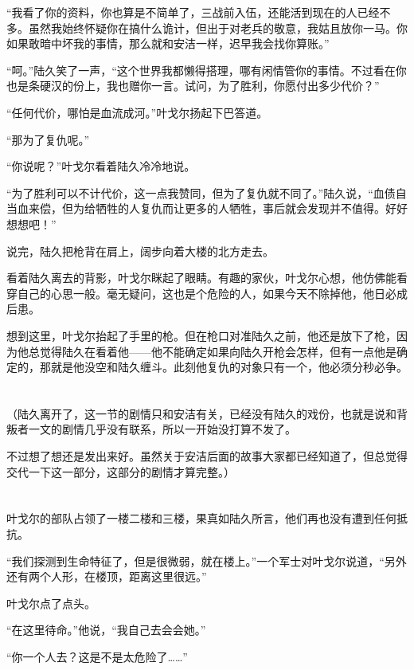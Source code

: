 “我看了你的资料，你也算是不简单了，三战前入伍，还能活到现在的人已经不多。虽然我始终怀疑你在搞什么诡计，但出于对老兵的敬意，我姑且放你一马。你如果敢暗中坏我的事情，那么就和安洁一样，迟早我会找你算账。”

“呵。”陆久笑了一声，“这个世界我都懒得搭理，哪有闲情管你的事情。不过看在你也是条硬汉的份上，我也赠你一言。试问，为了胜利，你愿付出多少代价？”

“任何代价，哪怕是血流成河。”叶戈尔扬起下巴答道。

“那为了复仇呢。”

“你说呢？”叶戈尔看着陆久冷冷地说。

“为了胜利可以不计代价，这一点我赞同，但为了复仇就不同了。”陆久说，“血债自当血来偿，但为给牺牲的人复仇而让更多的人牺牲，事后就会发现并不值得。好好想想吧！”

说完，陆久把枪背在肩上，阔步向着大楼的北方走去。

看着陆久离去的背影，叶戈尔眯起了眼睛。有趣的家伙，叶戈尔心想，他仿佛能看穿自己的心思一般。毫无疑问，这也是个危险的人，如果今天不除掉他，他日必成后患。

想到这里，叶戈尔抬起了手里的枪。但在枪口对准陆久之前，他还是放下了枪，因为他总觉得陆久在看着他——他不能确定如果向陆久开枪会怎样，但有一点他是确定的，那就是他没空和陆久缠斗。此刻他复仇的对象只有一个，他必须分秒必争。

\section*{}

（陆久离开了，这一节的剧情只和安洁有关，已经没有陆久的戏份，也就是说和背叛者一文的剧情几乎没有联系，所以一开始没打算不发了。

不过想了想还是发出来好。虽然关于安洁后面的故事大家都已经知道了，但总觉得交代一下这一部分，这部分的剧情才算完整。）

\section*{}

叶戈尔的部队占领了一楼二楼和三楼，果真如陆久所言，他们再也没有遭到任何抵抗。

“我们探测到生命特征了，但是很微弱，就在楼上。”一个军士对叶戈尔说道，“另外还有两个人形，在楼顶，距离这里很远。”

叶戈尔点了点头。

“在这里待命。”他说，“我自己去会会她。”

“你一个人去？这是不是太危险了……”

